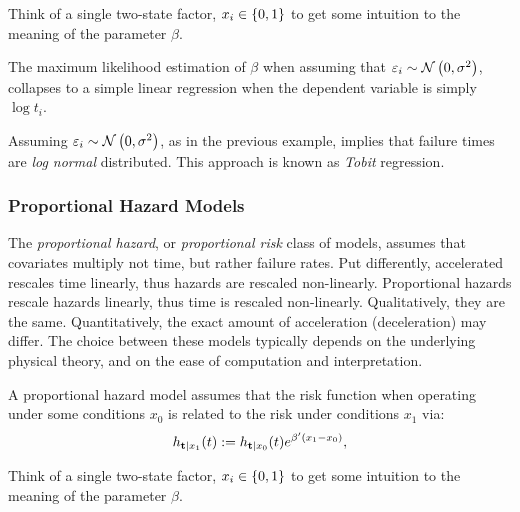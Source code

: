\begin{think}
	Think of a single two-state factor, $x_i \in\{ 0,1 \}$ to get some intuition to the meaning of the parameter $\beta$. 
\end{think}



\begin{example}
\label{eg:accelerated_gaussian}
The maximum likelihood estimation of $\beta$ when assuming that $\varepsilon_i \sim \mathcal{N}\left(0,\sigma^2\right)$, collapses to a simple linear regression when the dependent variable is simply $\log t_i$.
\end{example}


\begin{extra}
Assuming $\varepsilon_i \sim \mathcal{N}\left(0,\sigma^2\right)$, as in the previous example, implies that failure times are \emph{log normal} distributed. 
This approach is known as \emph{Tobit} regression.
\end{extra}







\subsubsection{Proportional Hazard Models}
The \emph{proportional hazard}, or \emph{proportional risk} class of models, assumes that covariates multiply not time, but rather failure rates. 
Put differently, accelerated rescales time linearly, thus hazards are rescaled non-linearly. Proportional hazards rescale hazards linearly, thus time is rescaled non-linearly. 
Qualitatively, they are the same. 
Quantitatively, the exact amount of acceleration (deceleration) may differ. 
The choice between these models typically depends on the underlying physical theory, and on the ease of computation and interpretation.


A proportional hazard model assumes that the risk function when operating under some conditions $x_0$ is related to the risk under conditions $x_1$ via:
\begin{align}
\label{eq:proportional_hazard}
	h_{\mathbf{t}|x_1} (t):=h_{\mathbf{t}|x_0} (t) e^{\beta'(x_1-x_0)}  ,
\end{align}


\begin{think}
	Think of a single two-state factor, $x_i \in\{ 0,1 \}$ to get some intuition to the meaning of the parameter $\beta$. 
\end{think}




